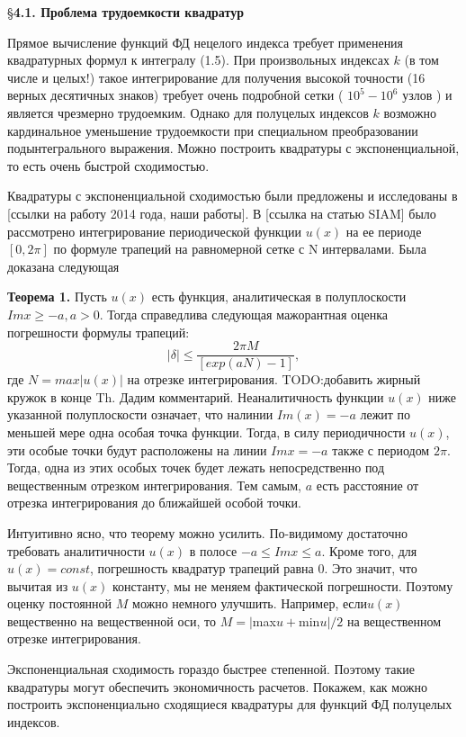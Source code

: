
\S \textbf{4.1. Проблема трудоемкости квадратур}

Прямое вычисление функций ФД нецелого индекса требует применения
квадратурных формул к интегралу (1.5). При произвольных индексах $k$ (в том числе и целых!) такое интегрирование для получения высокой точности (16 верных десятичных знаков) требует очень подробной сетки ( $10^5 - 10^6$ узлов ) и является чрезмерно трудоемким. Однако для полуцелых индексов $k$
возможно кардинальное уменьшение трудоемкости при специальном
преобразовании подынтегрального выражения. Можно построить квадратуры с
экспоненциальной, то есть очень быстрой сходимостью.

Квадратуры с экспоненциальной сходимостью были предложены и исследованы в [ссылки на работу 2014 года, наши работы]. В [ссылка на статью SIAM] было рассмотрено интегрирование периодической функции $u(x)$ на ее периоде $[0,2\pi]$ по формуле трапеций на равномерной сетке с N интервалами. Была доказана следующая

\textbf{Теорема 1.} Пусть $u(x)$ есть функция, аналитическая в полуплоскости $Imx \geqslant -a, a > 0$. Тогда справедлива следующая мажорантная оценка погрешности формулы трапеций:
\begin{equation}
|\delta| \leqslant \frac{2\pi M}{[exp(aN)-1]},
\label{eq:ref4_1}
\end{equation}
где $N=max|u(x)|$ на отрезке интегрирования. TODO:добавить жирный кружок в конце Th.
Дадим комментарий. Неаналитичность функции $u(x)$ ниже указанной полуплоскости означает, что налинии $Im(x)=-a$ лежит по меньшей мере одна особая точка функции. Тогда, в силу периодичности $u(x)$, эти особые точки будут расположены на линии $Imx=-a$ также с периодом $2\pi$. Тогда, одна из этих особых точек будет лежать непосредственно под вещественным отрезком интегрирования. Тем самым, $a$ есть расстояние от отрезка интегрирования до ближайшей особой точки.

Интуитивно ясно, что теорему можно усилить. По-видимому достаточно требовать аналитичности $u(x)$ в полосе  $-a \leqslant Im x \leqslant a$. Кроме того, для $u(x)=const$, погрешность квадратур трапеций равна 0. Это значит, что вычитая из $u(x)$ константу, мы не меняем фактической погрешности. Поэтому оценку постоянной $M$ можно немного улучшить. Например, $если u(x)$ вещественно на вещественной оси, то $M=|$max$u+$min$u|/2$ на вещественном отрезке интегрирования. 

Экспоненциальная сходимость гораздо быстрее степенной. Поэтому такие квадратуры могут обеспечить экономичность расчетов. Покажем, как можно построить экспоненциально сходящиеся квадратуры для функций ФД полуцелых индексов.

